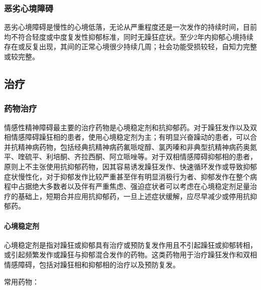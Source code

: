 \subsubsection{恶劣心境障碍}

恶劣心境障碍是慢性的心境低落，无论从严重程度还是一次发作的持续时间，目前均不符合轻度或中度复发性抑郁标准，同时无躁狂症状。至少2年内抑郁心境持续存在或反复出现，其间的正常心境很少持续几周；社会功能受损较轻，自知力完整或较完整。

\subsection{治疗}

\subsubsection{药物治疗}

情感性精神障碍最主要的治疗药物是心境稳定剂和抗抑郁药。对于躁狂发作以及双相情感障碍躁狂相的患者，使用心境稳定剂为主；有明显兴奋躁动的患者，可以合并抗精神病药物，包括经典抗精神病药氟哌啶醇、氯丙嗪和非典型抗精神病药奥氮平、喹硫平、利培酮、齐拉西酮、阿立哌唑等。对于双相情感障碍抑郁相的患者，原则上不主张使用抗抑郁药物，因其容易诱发躁狂发作、快速循环发作或导致抑郁症状慢性化，对于抑郁发作比较严重甚至伴有明显消极行为者、抑郁发作在整个病程中占据绝大多数者以及伴有严重焦虑、强迫症状者可以考虑在心境稳定剂足量治疗的基础上，短期合并应用抗抑郁药，一旦上述症状缓解，应尽早减少或停用抗抑郁药。
\paragraph{心境稳定剂}

心境稳定剂是指对躁狂或抑郁具有治疗或预防复发作用且不引起躁狂或抑郁转相，或引起频繁发作或躁狂与抑郁混合发作的药物。这类药物用于治疗躁狂发作和双相情感障碍，包括对躁狂相和抑郁相的治疗以及预防复发。

常用药物：

